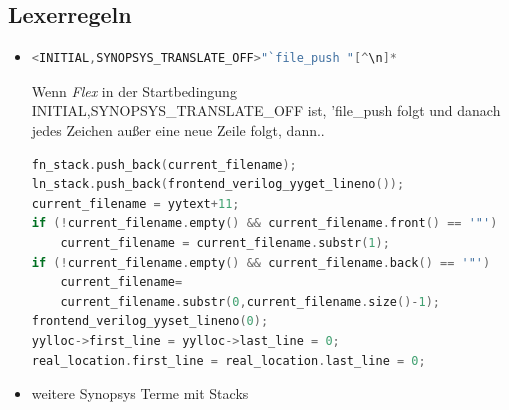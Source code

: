 \documentclass[11pt]{report}
\begin{document}
\subsection{Lexerregeln}

\begin{itemize}
\item
\begin{lstlisting}[language=C++]
<INITIAL,SYNOPSYS_TRANSLATE_OFF>"`file_push "[^\n]*	
\end{lstlisting}
Wenn \textit{Flex} in der Startbedingung INITIAL,SYNOPSYS\_TRANSLATE\_OFF ist, 'file\_push folgt und danach jedes Zeichen außer eine neue Zeile folgt, dann..
\begin{lstlisting}[language=C++]
fn_stack.push_back(current_filename);
ln_stack.push_back(frontend_verilog_yyget_lineno());
current_filename = yytext+11;
if (!current_filename.empty() && current_filename.front() == '"')
	current_filename = current_filename.substr(1);
if (!current_filename.empty() && current_filename.back() == '"')
	current_filename=
	current_filename.substr(0,current_filename.size()-1);
frontend_verilog_yyset_lineno(0);
yylloc->first_line = yylloc->last_line = 0;
real_location.first_line = real_location.last_line = 0;
\end{lstlisting}


\item weitere Synopsys Terme mit Stacks


\end{itemize}
\end{document}
